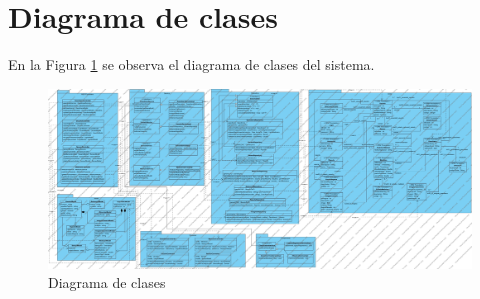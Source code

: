 \section{Diagrama de clases}
En la Figura \ref{fig:diagrama_clases} se observa el diagrama de clases del sistema.
\begin{figure}[H]
	\centering
	\includegraphics[scale=.21, angle=90]{Capitulo4/images/Clases}
	\caption{Diagrama de clases}
	\label{fig:diagrama_clases}
\end{figure}